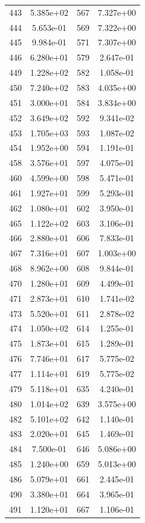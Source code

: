 \documentclass[12pt]{article}
\begin{document}
\begin{longtable}{@{}cccc@{}}
443 & 5.385e+02 & 567 & 7.327e+00 \\
444 & 5.653e-01 & 569 & 7.322e+00 \\
445 & 9.984e-01 & 571 & 7.307e+00 \\
446 & 6.280e+01 & 579 & 2.647e-01 \\
449 & 1.228e+02 & 582 & 1.058e-01 \\
450 & 7.240e+02 & 583 & 4.035e+00 \\
451 & 3.000e+01 & 584 & 3.834e+00 \\
452 & 3.649e+02 & 592 & 9.341e-02 \\
453 & 1.705e+03 & 593 & 1.087e-02 \\
454 & 1.952e+00 & 594 & 1.191e-01 \\
458 & 3.576e+01 & 597 & 4.075e-01 \\
460 & 4.599e+00 & 598 & 5.471e-01 \\
461 & 1.927e+01 & 599 & 5.293e-01 \\
462 & 1.080e+01 & 602 & 3.950e-01 \\
465 & 1.122e+02 & 603 & 3.106e-01 \\
466 & 2.880e+01 & 606 & 7.833e-01 \\
467 & 7.316e+01 & 607 & 1.003e+00 \\
468 & 8.962e+00 & 608 & 9.844e-01 \\
470 & 1.280e+01 & 609 & 4.499e-01 \\
471 & 2.873e+01 & 610 & 1.741e-02 \\
473 & 5.520e+01 & 611 & 2.878e-02 \\
474 & 1.050e+02 & 614 & 1.255e-01 \\
475 & 1.873e+01 & 615 & 1.289e-01 \\
476 & 7.746e+01 & 617 & 5.775e-02 \\
477 & 1.114e+01 & 619 & 5.775e-02 \\
479 & 5.118e+01 & 635 & 4.240e-01 \\
480 & 1.014e+02 & 639 & 3.575e+00 \\
482 & 5.101e+02 & 642 & 1.140e-01 \\
483 & 2.020e+01 & 645 & 1.469e-01 \\
484 & 7.500e-01 & 646 & 5.086e+00 \\
485 & 1.240e+00 & 659 & 5.013e+00 \\
486 & 5.079e+01 & 661 & 2.445e-01 \\
490 & 3.380e+01 & 664 & 3.965e-01 \\
491 & 1.120e+01 & 667 & 1.106e-01 \\

\end{longtable}
\end{document}
